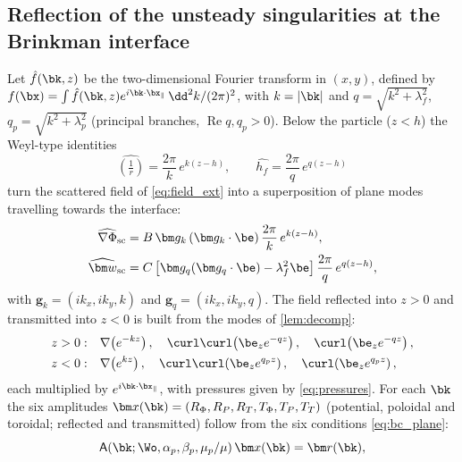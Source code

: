 \subsection{Reflection of the unsteady singularities at the Brinkman interface}\label{sec:reflection}
Let $\hat f(\bk,z)$ be the two-dimensional Fourier transform in $(x,y)$, defined by
$f(\bx)=\int\hat f(\bk,z)e^{i\bk\cdot\bx_\parallel}\,\dd^2k/(2\pi)^2$, with $k=|\bk|$ and
$q=\sqrt{k^2+\lambda_f^2}$, $q_p=\sqrt{k^2+\lambda_p^2}$ (principal branches, $\operatorname{Re}q,q_p>0$). Below the
particle ($z<h$) the Weyl-type identities
\begin{equation}
  \widehat{\left(\tfrac1r\right)}=\frac{2\pi}{k}\,e^{k(z-h)},\qquad
  \widehat{h_f}=\frac{2\pi}{q}\,e^{q(z-h)}
  \label{eq:weyl}
\end{equation}
turn the scattered field of \cref{eq:field_ext} into a superposition of plane modes travelling towards the interface:
\begin{subequations}\label{eq:incident_fourier}
\begin{align}
  \widehat{\nabla\Phi}_{\rm sc}&=B\,\bm g_k\,(\bm g_k\cdot\be)\,\frac{2\pi}{k}\,e^{k(z-h)},\\
  \widehat{\bm w}_{\rm sc}&=C\left[\bm g_q(\bm g_q\cdot\be)-\lambda_f^2\be\right]\frac{2\pi}{q}\,e^{q(z-h)},
\end{align}
\end{subequations}
with $\bm g_k=(ik_x,ik_y,k)$ and $\bm g_q=(ik_x,ik_y,q)$. The field reflected into $z>0$ and transmitted into $z<0$ is
built from the modes of \cref{lem:decomp}:
\begin{subequations}\label{eq:modes}
\begin{align}
  z>0:&\quad \nabla\!\left(e^{-kz}\right),\quad \curl\curl\!\left(\be_z e^{-qz}\right),\quad \curl\!\left(\be_z e^{-qz}\right),\\
  z<0:&\quad \nabla\!\left(e^{kz}\right),\quad \curl\curl\!\left(\be_z e^{q_pz}\right),\quad \curl\!\left(\be_z e^{q_pz}\right),
\end{align}
\end{subequations}
each multiplied by $e^{i\bk\cdot\bx_\parallel}$, with pressures given by \cref{eq:pressures}. For each $\bk$ the six
amplitudes $\bm x(\bk)=(R_\Phi,R_P,R_T,T_\Phi,T_P,T_T)$ (potential, poloidal and toroidal; reflected and transmitted)
follow from the six conditions \cref{eq:bc_plane}:
\begin{equation}
  \mathsf A(\bk;\Wo,\alpha_p,\beta_p,\mu_p/\mu)\,\bm x(\bk)=\bm r(\bk),
  \label{eq:interface_system}
\end{equation}
